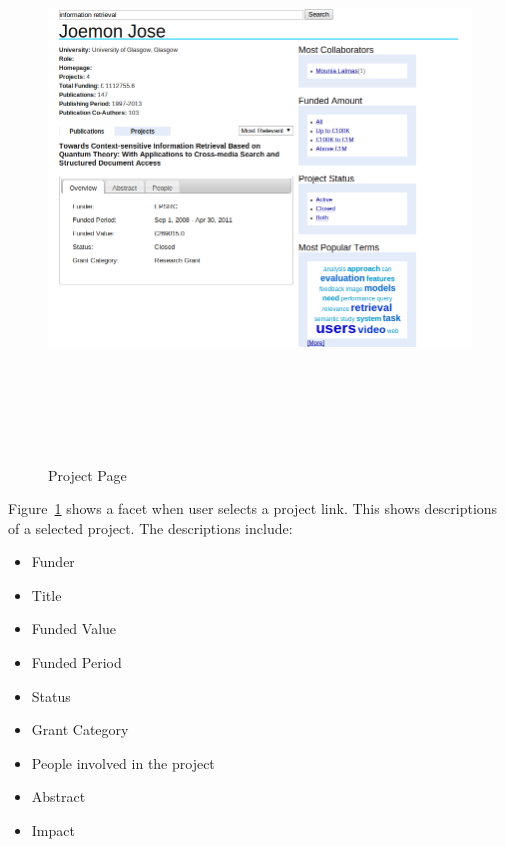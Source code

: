 \begin{figure}
\centering
\includegraphics[width=13cm,height=15cm,keepaspectratio]{./figures/newProfileSelectedProject.png}
\caption{Project Page} \label{fig:newProfileSelectedProject} 
\end{figure}

Figure~\ref{fig:newProfileSelectedProject} shows a facet when user selects a project link. This shows descriptions of a selected project.
The descriptions include:
\begin{itemize}
 \item Funder
 \item Title
 \item Funded Value
 \item Funded Period
 \item Status
 \item Grant Category
 \item People involved in the project
 \item Abstract
 \item Impact
\end{itemize}






